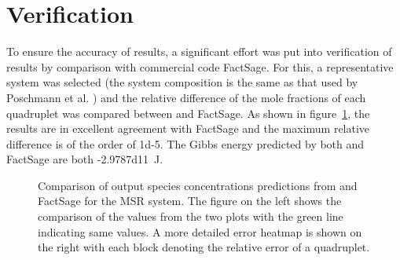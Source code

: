 \section{Verification}
To ensure the accuracy of results, a significant effort was put into verification of {\GEM} results by comparison with commercial code FactSage. For this, a representative system was selected (the system composition is the same as that used by Poschmann et al. \cite{Poschmann:2021ab}) and the relative difference of the mole fractions of each quadruplet was compared between {\GEM} and FactSage. As shown in figure~\ref{fig:verif}, the results are in excellent agreement with FactSage and the maximum relative difference is of the order of \num{1d-5}. The Gibbs energy predicted by both {\GEM} and FactSage are both \SI{-2.9787d11}{\joule}. 
\begin{figure}[!ht]
    \hfill
    \caption[Comparison of output species concentrations predictions from {\GEM} and FactSage for the MSR system.]{Comparison of output species concentrations predictions from {\GEM} and FactSage for the MSR system. The figure on the left shows the comparison of the values from the two plots with the green line indicating same values. A more detailed error heatmap is shown on the right with each block denoting the relative error of a quadruplet.}
    \label{fig:verif}
\end{figure}

